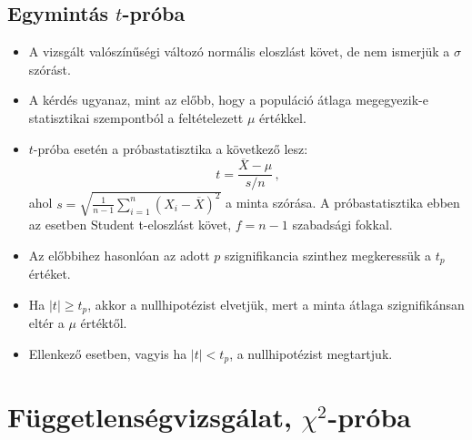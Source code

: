 \documentclass[12pt]{article}
\theoremstyle{plain}
\begin{document}
\subsection{Egymintás $t$-próba \cite{tprobawiki}}
\begin{itemize}
    \item A vizsgált valószínűségi változó normális eloszlást követ, de nem ismerjük a $\sigma$ szórást.
    \item A kérdés ugyanaz, mint az előbb, hogy a populáció átlaga megegyezik-e statisztikai szempontból a
    feltételezett $\mu$ értékkel.
    \item $t$-próba esetén a próbastatisztika a következő lesz:
        \begin{equation*}
            t = \frac{\overline{X}-\mu}{s/n} \,\text{,}
        \end{equation*}
        ahol ${\displaystyle s = \sqrt{\frac{1}{n-1}\sum\limits_{i=1}^{n}(X_i-\overline{X})^2}}$ a minta szórása. A próbastatisztika
        ebben az esetben Student t-eloszlást követ, $f=n-1$ szabadsági fokkal.
    \item Az előbbihez hasonlóan az adott $p$ szignifikancia szinthez megkeressük a $t_p$ értéket.
    \item Ha $|t| \geq t_p$, akkor a nullhipotézist elvetjük, mert a minta átlaga szignifikánsan eltér a $\mu$ értéktől.
    \item Ellenkező esetben, vagyis ha $|t| < t_p$, a nullhipotézist megtartjuk.
\end{itemize}

\section{Függetlenségvizsgálat, $\chi^2$-próba}



\end{document}
